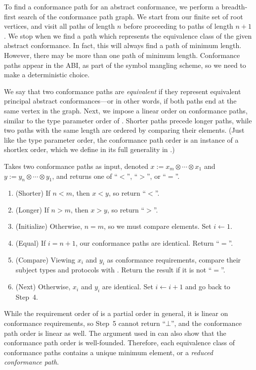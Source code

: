 \documentclass[../generics]{subfiles}
\begin{document}
To find a conformance path for an abstract conformance, we perform a breadth-first search of the conformance path graph. We start from our finite set of root vertices, and visit all paths of length $n$ before proceeding to paths of length $n+1$. We stop when we find a path which represents the equivalence class of the given abstract conformance. In fact, this will always find a path of minimum length. However, there may be more than one path of minimum length. Conformance paths appear in the ABI, as part of the symbol mangling scheme, so we need to make a deterministic choice.

We say that two conformance paths are \emph{equivalent} if they represent equivalent principal abstract conformances---or in other words, if both paths end at the same vertex in the graph. Next, we impose a linear order on conformance paths, similar to the type parameter order of . Shorter paths precede longer paths, while two paths with the same length are ordered by comparing their elements. (Just like the type parameter order, the conformance path order is an instance of a shortlex order, which we define in its full generality in .)

\begin{algorithm}\label{conformance path order alg}
Takes two conformance paths as input, denoted $x:=x_m \otimes \cdots \otimes x_1$ and $y:=y_n \otimes \cdots \otimes y_1$, and returns one of ``$<$'', ``$>$'', or ``$=$''.
\begin{enumerate}
\item (Shorter) If $n<m$, then $x<y$, so return ``$<$''.
\item (Longer) If $n>m$, then $x>y$, so return ``$>$''.
\item (Initialize) Otherwise, $n=m$, so we must compare elements. Set $i \leftarrow 1$.
\item (Equal) If $i=n+1$, our conformance paths are identical. Return ``$=$''.
\item (Compare) Viewing $x_i$ and $y_i$ as conformance requirements, compare their subject types and protocols with . Return the result if it is not ``$=$''.
\item (Next) Otherwise, $x_i$ and $y_i$ are identical. Set $i\leftarrow i+1$ and go back to Step~4.
\end{enumerate}
\end{algorithm}
While the requirement order of  is a partial order in general, it is linear on conformance requirements, so Step~5 cannot return ``$\bot$'', and the conformance path order is linear as well. The argument used in  can also show that the conformance path order is well-founded. Therefore, each equivalence class of conformance paths contains a unique minimum element, or a \emph{reduced conformance path}.
\end{document}
